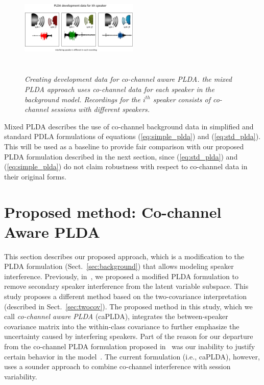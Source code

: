 \documentclass[journal]{IEEEtran}
\begin{document}
\begin{figure}[t!]
	\centering
	\vspace{0mm}
	\includegraphics[width=0.5\textwidth, height=1.8in]{figures/mixedPLDA_slide-crop}
  	\vspace{-5mm}
	\caption{\it \small Creating development data for co-channel aware PLDA. the mixed PLDA approach uses co-channel data for each speaker in the background model. Recordings for the $i^{th}$ speaker consists of co-channel sessions with different speakers.}
	\label{fig:mixedPLDA_diagram}
	\vspace{-3mm}
\end{figure}

Mixed PLDA describes the use of co-channel background data in simplified and standard PDLA formulations of equations (\ref{eq:simple_plda}) and (\ref{eq:std_plda}). 
This will be used as a baseline to provide fair comparison with our proposed PLDA formulation described in the next section, since (\ref{eq:std_plda}) and (\ref{eq:simple_plda}) do not claim robustness with respect to co-channel data in their original forms. 


\section{Proposed method: Co-channel Aware PLDA}
\label{sec:cch_plda}
This section describes our proposed approach, which is a modification to the PLDA formulation (Sect.~\ref{sec:background}) that allows modeling speaker interference. 
Previously, in~\cite{shokouhi2015probabilistic}, we proposed a modified PLDA formulation to remove secondary speaker interference from the latent variable subspace. 
This study proposes a different method based on the two-covariance interpretation (described in Sect.~\ref{sec:twocov}). 
The proposed method in this study, which we call {\it co-channel aware PLDA} (caPLDA), integrates the between-speaker covariance matrix into the within-class covariance to further emphasize the uncertainty caused by interfering speakers. 
Part of the reason for our departure from the co-channel PLDA formulation proposed in~\cite{shokouhi2015probabilistic} was our inability to justify certain behavior in the model~\cite{navid_phd_thesis}. 
The current formulation (i.e., caPLDA), however, uses a sounder approach to combine co-channel interference with session variability. 
\end{document}
